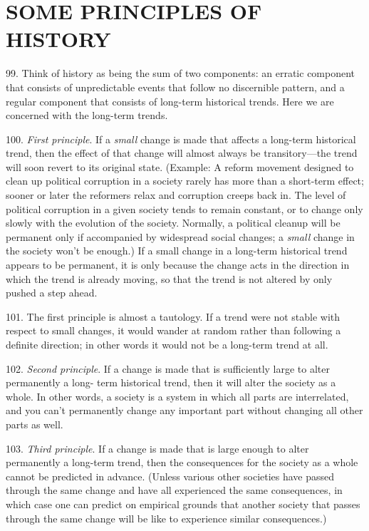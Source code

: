 \documentclass{article}
\begin{document}
\section{SOME PRINCIPLES OF HISTORY}

\hspace{0.5cm} 99. Think of history as being the sum of two components: an erratic component that consists of 
unpredictable events that follow no discernible pattern, and a regular component that consists of 
long-term historical trends. Here we are concerned with the long-term trends. \vspace{\baselineskip}

100. \textit{First principle}. If a \textit{small} change is made that affects a long-term historical trend, then the 
effect of that change will almost always be transitory—the trend will soon revert to its original 
state. (Example: A reform movement designed to clean up political corruption in a society rarely 
has more than a short-term effect; sooner or later the reformers relax and corruption creeps back 
in. The level of political corruption in a given society tends to remain constant, or to change only 
slowly with the evolution of the society. Normally, a political cleanup will be permanent only if 
accompanied by widespread social changes; a \textit{small} change in the society won’t be enough.) If a
small change in a long-term historical trend appears to be permanent, it is only because the change 
acts in the direction in which the trend is already moving, so that the trend is not altered by only 
pushed a step ahead. \vspace{\baselineskip}

101. The first principle is almost a tautology. If a trend were not stable with respect to small 
changes, it would wander at random rather than following a definite direction; in other words it 
would not be a long-term trend at all. \vspace{\baselineskip}

102. \textit{Second principle}. If a change is made that is sufficiently large to alter permanently a long-
term historical trend, then it will alter the society as a whole. In other words, a society is a system 
in which all parts are interrelated, and you can’t permanently change any important part without 
changing all other parts as well. \vspace{\baselineskip}

103. \textit{Third principle}. If a change is made that is large enough to alter permanently a long-term 
trend, then the consequences for the society as a whole cannot be predicted in advance. (Unless 
various other societies have passed through the same change and have all experienced the same 
consequences, in which case one can predict on empirical grounds that another society that passes 
through the same change will be like to experience similar consequences.) \vspace{\baselineskip}
\end{document}

